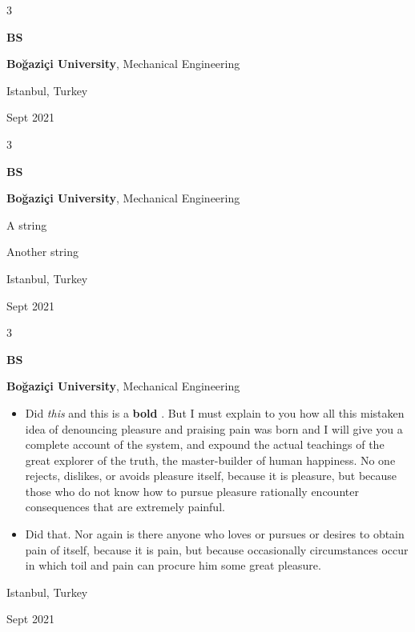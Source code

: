 \documentclass[10pt, letterpaper]{article}
\newenvironment{summary}{
    \begin{description}[
        topsep=0.10 cm,
        parsep=0.10 cm,
        partopsep=0pt,
        itemsep=0pt,
        leftmargin=0.4 cm + 10pt
    ]
}{
    \end{description}
} %
\newenvironment{highlights}{
    \begin{itemize}[
        topsep=0.10 cm,
        parsep=0.10 cm,
        partopsep=0pt,
        itemsep=0pt,
        leftmargin=0.4 cm + 10pt
    ]
}{
    \end{itemize}
} %
\newenvironment{threecolentry}[3][]{
    \onecolentry
    \def\thirdColumn{#3}
    \setcolumnwidth{1 cm, \fill, 4.5 cm}
    \begin{paracol}{3}
    {\raggedright #2} \switchcolumn
}{
    \switchcolumn \raggedleft \thirdColumn
    \end{paracol}
    \endonecolentry
} %
\let\hrefWithoutArrow\href
\renewcommand{\href}[2]{\hrefWithoutArrow{#1}{\ifthenelse{\equal{#2}{}}{ }{#2 }\raisebox{.15ex}{\footnotesize \faExternalLink*}}}
\begin{document}
        \vspace{0.2 cm}

        \begin{threecolentry}{\textbf{BS}}{
            Istanbul, Turkey

        Sept 2021
        }
            \textbf{Boğaziçi University}, Mechanical Engineering
        \end{threecolentry}

        \vspace{0.2 cm}

        \begin{threecolentry}{\textbf{BS}}{
            Istanbul, Turkey

        Sept 2021
        }
            \textbf{Boğaziçi University}, Mechanical Engineering
            \begin{summary}
                \item A string
                \item Another string
            \end{summary}
        \end{threecolentry}

        \vspace{0.2 cm}

        \begin{threecolentry}{\textbf{BS}}{
            Istanbul, Turkey

        Sept 2021
        }
            \textbf{Boğaziçi University}, Mechanical Engineering
            \begin{highlights}
                \item Did \textit{this} and this is a \textbf{bold} \href{https://example.com}{link}. But I must explain to you how all this mistaken idea of denouncing pleasure and praising pain was born and I will give you a complete account of the system, and expound the actual teachings of the great explorer of the truth, the master-builder of human happiness. No one rejects, dislikes, or avoids pleasure itself, because it is pleasure, but because those who do not know how to pursue pleasure rationally encounter consequences that are extremely painful.
                \item Did that. Nor again is there anyone who loves or pursues or desires to obtain pain of itself, because it is pain, but because occasionally circumstances occur in which toil and pain can procure him some great pleasure.
            \end{highlights}
        \end{threecolentry}
\end{document}
